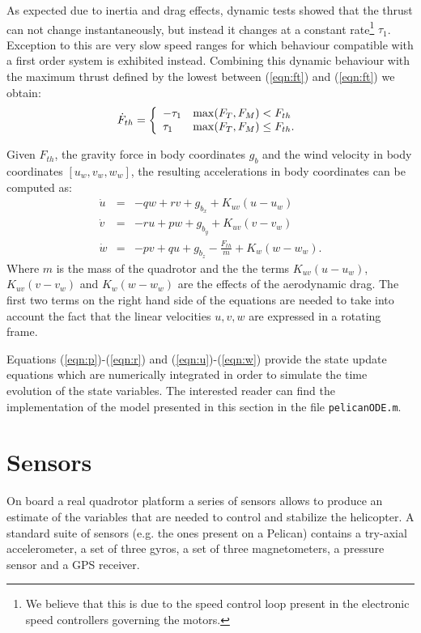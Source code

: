 \documentclass[a4paper,11pt]{report}
\begin{document}
As expected due to inertia and drag effects, dynamic tests showed that the thrust can not change instantaneously, but instead it changes at a constant rate\footnote{We believe that this is due to the speed control loop present in the electronic speed controllers governing the motors.} $\tau_1$. Exception to this are very slow speed ranges for which behaviour compatible with a first order system is exhibited instead. Combining this dynamic behaviour with the maximum thrust defined by the lowest between (\ref{eqn:ft}) and (\ref{eqn:ft}) we obtain:
\begin{equation}
\dot{F}_{th}=\left\{ \begin{array}{l l} -\tau_1 & \max(F_T,F_M)<F_{th} \\ \tau_1  & \max(F_T,F_M)\leq F_{th}. \end{array} \right .\\
\end{equation}

Given $F_{th}$, the gravity force in body coordinates $g_b$ and the wind velocity in body coordinates $[u_w,v_w,w_w]$, the resulting accelerations in body coordinates can be computed as:
\begin{eqnarray}
\dot{u} &=& -q w + r v + g_{b_x} + K_{uv}(u-u_w)\label{eqn:u}\\
\dot{v} &=& -r u + p w + g_{b_y} + K_{uv}(v-v_w)\\
\dot{w} & =& -p v + q u + g_{b_z} - \frac{F_{th}}{m} + K_w (w-w_w). \label{eqn:w}
\end{eqnarray}
Where $m$ is the mass of the quadrotor and the the terms $K_{uv}(u-u_w)$,$K_{uv}(v-v_w)$ and $K_w(w-w_w)$ are the effects of the aerodynamic drag. The first two terms on the right hand side of the equations are needed to take into account the fact that the linear velocities $u,v,w$ are expressed in a rotating frame. 
 
Equations (\ref{eqn:p})-(\ref{eqn:r}) and (\ref{eqn:u})-(\ref{eqn:w}) provide the state update equations which are numerically integrated in order to simulate the time evolution of the state variables.
The interested reader can find the implementation of the model presented in this section in the file \texttt{pelicanODE.m}.  


\section{Sensors}

On board a real quadrotor platform a series of sensors allows to produce an estimate of the variables that are needed to control and stabilize the helicopter.
A standard suite of sensors (e.g. the ones present on a Pelican) contains a try-axial accelerometer, a set of three gyros, a set of three magnetometers, a pressure sensor and a GPS receiver.
\end{document}
